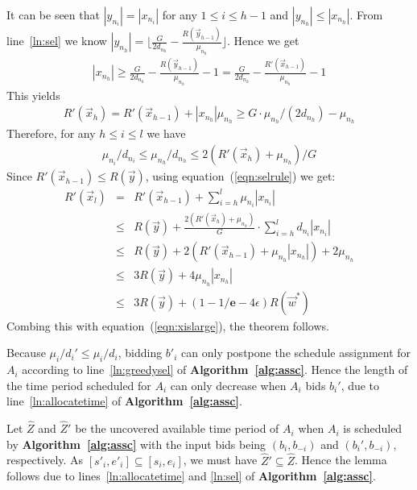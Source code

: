 \documentclass[10pt,journal,compsoc]{IEEEtran}
\begin{document}
\begin{IEEEproof}
It can be seen that $|y_{n_i}|= |x_{n_i}|$ for any $1\leq i\leq h-1$ and $|y_{n_h}|\leq |x_{n_h}|$. From line~\ref{ln:sel} we know $|y_{n_h}|=\lfloor\frac{G}{2d_{n_h}}-\frac{R(\vec{y}_{{h-1}})}{\mu_{n_h}}\rfloor$. Hence we get
\begin{eqnarray}
|x_{n_h}|\geq \frac{G}{2d_{n_h}}-\frac{R(\vec{y}_{{h-1}})}{\mu_{n_h}}-1 = \frac{G}{2d_{n_h}}-\frac{R'(\vec{x}_{{h-1}})}{\mu_{n_h}}-1\nonumber
\end{eqnarray}
This yields
\begin{eqnarray}
R'(\vec{x}_{h})=R'(\vec{x}_{{h-1}})+|x_{n_h}|\mu_{n_h} \geq {G\cdot \mu_{n_h}}/({2d_{n_h}})-\mu_{n_h}\nonumber
\end{eqnarray}
Therefore, for any $h\leq i\leq l$ we have
\begin{eqnarray}
{\mu_{n_i}}/{d_{n_i}}\leq {\mu_{n_h}}/{d_{n_h}}\leq {2(R'(\vec{x}_{h})+\mu_{n_h})}/{G} \label{eqn:selrule}
\end{eqnarray}
Since $R'(\vec{x}_{{h-1}})\leq R(\vec{y})$, using equation~(\ref{eqn:selrule}) we get:
\begin{eqnarray}
R'(\vec{x}_l)&=&R'(\vec{x}_{{h-1}}) + \sum_{i=h}^l \mu_{n_i}|x_{n_i}|\nonumber\\
&\leq& R(\vec{y}) +\frac{2(R'(\vec{x}_{h})+\mu_{n_h})}{G}\cdot \sum_{i=h}^l d_{n_i}|x_{n_i}|\nonumber\\
&\leq& R(\vec{y}) + 2(R'(\vec{x}_{h-1})+\mu_{n_h}|x_{n_h}|)+2\mu_{n_h}\nonumber\\
&\leq& 3R(\vec{y})+4 \mu_{n_h}|x_{n_h}|\nonumber\\
&\leq& 3R(\vec{y})+(1-1/{\mathbf{e}}-4\epsilon)R(\vec{w}^*)\nonumber
\end{eqnarray}
Combing this with equation~(\ref{eqn:xislarge}), the theorem follows.
\end{IEEEproof}

\begin{IEEEproof} 
Because $\mu_i/d_i'\leq \mu_i/d_i$, bidding $b'_i$ can only postpone the schedule assignment for $A_i$ according to line~\ref{ln:greedysel} of \textbf{Algorithm~\ref{alg:assc}}. Hence the length of the time period scheduled for $A_i$ can only decrease when $A_i$ bids $b_i'$, due to line~\ref{ln:allocatetime} of \textbf{Algorithm~\ref{alg:assc}}.
\end{IEEEproof}

\begin{IEEEproof}
Let $\widehat{{Z}}$ and $\widehat{{Z}}'$ be the uncovered available time period of $A_i$ when $A_i$ is scheduled by \textbf{Algorithm~\ref{alg:assc}} with the input bids being $(b_i,b_{-i})$ and $(b_i',b_{-i})$, respectively. As $[s'_i,e'_i]\subseteq [s_i,e_i]$, we must have $\widehat{{Z}}'\subseteq \widehat{{Z}}$. Hence the lemma follows due to lines~\ref{ln:allocatetime} and \ref{ln:sel} of \textbf{Algorithm~\ref{alg:assc}}.
\end{IEEEproof}
\end{document}
